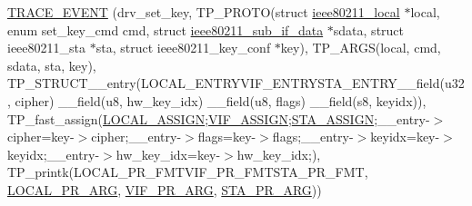 \begin{DoxyCompactItemize}
\hyperlink{driver-trace_8h_af0b53933573d19e1fcead14636a628dd}{T\-R\-A\-C\-E\-\_\-\-E\-V\-E\-N\-T} (drv\-\_\-set\-\_\-key, T\-P\-\_\-\-P\-R\-O\-T\-O(struct \hyperlink{structieee80211__local}{ieee80211\-\_\-local} $\ast$local, enum set\-\_\-key\-\_\-cmd cmd, struct \hyperlink{structieee80211__sub__if__data}{ieee80211\-\_\-sub\-\_\-if\-\_\-data} $\ast$sdata, struct ieee80211\-\_\-sta $\ast$sta, struct ieee80211\-\_\-key\-\_\-conf $\ast$key), T\-P\-\_\-\-A\-R\-G\-S(local, cmd, sdata, sta, key), T\-P\-\_\-\-S\-T\-R\-U\-C\-T\-\_\-\-\_\-entry(L\-O\-C\-A\-L\-\_\-\-E\-N\-T\-R\-Y\-V\-I\-F\-\_\-\-E\-N\-T\-R\-Y\-S\-T\-A\-\_\-\-E\-N\-T\-R\-Y\-\_\-\-\_\-field(u32, cipher) \-\_\-\-\_\-field(u8, hw\-\_\-key\-\_\-idx) \-\_\-\-\_\-field(u8, flags) \-\_\-\-\_\-field(s8, keyidx)), T\-P\-\_\-fast\-\_\-assign(\hyperlink{driver-trace_8h_ab19d9141887ea92ef9640df06a51e0a1}{L\-O\-C\-A\-L\-\_\-\-A\-S\-S\-I\-G\-N};\hyperlink{driver-trace_8h_af5ede80f04ffcb3f644f68837b1d252c}{V\-I\-F\-\_\-\-A\-S\-S\-I\-G\-N};\hyperlink{driver-trace_8h_abbd837b5fc444c0cb48b5954f8ad068a}{S\-T\-A\-\_\-\-A\-S\-S\-I\-G\-N};\-\_\-\-\_\-entry-\/$>$cipher=key-\/$>$cipher;\-\_\-\-\_\-entry-\/$>$flags=key-\/$>$flags;\-\_\-\-\_\-entry-\/$>$keyidx=key-\/$>$keyidx;\-\_\-\-\_\-entry-\/$>$hw\-\_\-key\-\_\-idx=key-\/$>$hw\-\_\-key\-\_\-idx;), T\-P\-\_\-printk(L\-O\-C\-A\-L\-\_\-\-P\-R\-\_\-\-F\-M\-T\-V\-I\-F\-\_\-\-P\-R\-\_\-\-F\-M\-T\-S\-T\-A\-\_\-\-P\-R\-\_\-\-F\-M\-T, \hyperlink{driver-trace_8h_aa2a77a17621ecb4f0b3926fec90a5538}{L\-O\-C\-A\-L\-\_\-\-P\-R\-\_\-\-A\-R\-G}, \hyperlink{driver-trace_8h_a12c9f3afcd1c461f7ae2f86fd8503977}{V\-I\-F\-\_\-\-P\-R\-\_\-\-A\-R\-G}, \hyperlink{driver-trace_8h_a3b71cc34bae124028f19970a4220d4ab}{S\-T\-A\-\_\-\-P\-R\-\_\-\-A\-R\-G}))
\item 

\end{DoxyCompactItemize}
